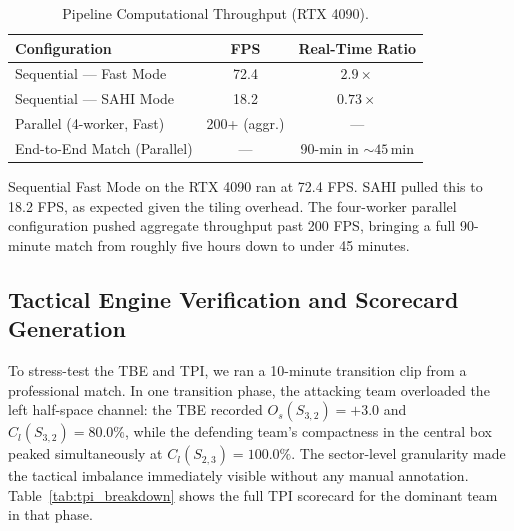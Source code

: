 \documentclass[conference]{IEEEtran}
\begin{document}
\begin{table}[!t]
\centering
\caption{Pipeline Computational Throughput (RTX 4090).}
\label{tab:throughput}
\begin{tabular}{lcc}
\toprule
\textbf{Configuration} & \textbf{FPS} & \textbf{Real-Time Ratio} \\
\midrule
Sequential --- Fast Mode   & 72.4         & $2.9\times$ \\
Sequential --- SAHI Mode   & 18.2         & $0.73\times$ \\
\midrule
Parallel (4-worker, Fast)  & 200+ (aggr.) & --- \\
End-to-End Match (Parallel)& ---          & 90-min in ${\sim}45$\,min \\
\bottomrule
\end{tabular}
\end{table}

Sequential Fast Mode on the RTX 4090 ran at 72.4 FPS. SAHI pulled this to 18.2 FPS, as expected given the tiling overhead. The four-worker parallel configuration pushed aggregate throughput past 200 FPS, bringing a full 90-minute match from roughly five hours down to under 45 minutes.

\subsection{Tactical Engine Verification and Scorecard Generation}

To stress-test the TBE and TPI, we ran a 10-minute transition clip from a professional match. In one transition phase, the attacking team overloaded the left half-space channel: the TBE recorded $O_s(S_{3,2}) = +3.0$ and $C_l(S_{3,2}) = 80.0\%$, while the defending team's compactness in the central box peaked simultaneously at $C_l(S_{2,3}) = 100.0\%$. The sector-level granularity made the tactical imbalance immediately visible without any manual annotation. Table~\ref{tab:tpi_breakdown} shows the full TPI scorecard for the dominant team in that phase.
\end{document}
